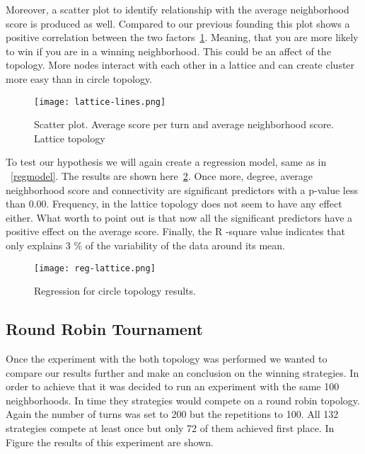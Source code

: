 \newpage

Moreover, a scatter plot to identify relationship with the average neighborhood
score is produced as well. Compared to our previous founding this plot shows a positive
correlation between the two factors~\ref{fig:lattice-scatter-plot}. Meaning, that you are more
likely to win
if you are in a winning neighborhood. This could be an affect of the topology.
More nodes interact with each other in a lattice and can create cluster more easy
than in circle topology.

\begin{figure}[h!]
\centering
    \texttt{[image: lattice-lines.png]}
    \caption{Scatter plot. Average score per turn and average neighborhood score.
              Lattice topology}
    \label{fig:lattice-scatter-plot}
\end{figure}

To test our hypothesis we will again create a regression model, same as
in ~\ref{regmodel}. The results are shown here~\ref{fig:lattice-regression}.
Once more, degree, average neighborhood score and connectivity are significant
predictors with a p-value less than 0.00. Frequency, in the lattice topology
does not seem to have any effect either. What worth to point out is that
now all the significant predictors have a positive effect on the average score.
Finally, the R -square value indicates that only explains 3 \% of the variability
of the data around its mean.

\begin{figure}[h!]
\centering
    \texttt{[image: reg-lattice.png]}
    \caption{Regression for circle topology results.}
    \label{fig:lattice-regression}
\end{figure}
\newpage

\subsection{Round Robin Tournament}
\label{sub:robin}

Once the experiment with the both topology was performed we wanted to compare
our results further and make an conclusion on the winning strategies. In order
to achieve that it was decided to run an experiment with the same 100 neighborhoods.
In time they strategies would compete on a round robin topology. Again the
number of turns was set to 200 but the repetitions to 100. All 132 strategies
compete at least once but only 72 of them achieved first place. In Figure
the results of this experiment are shown.

